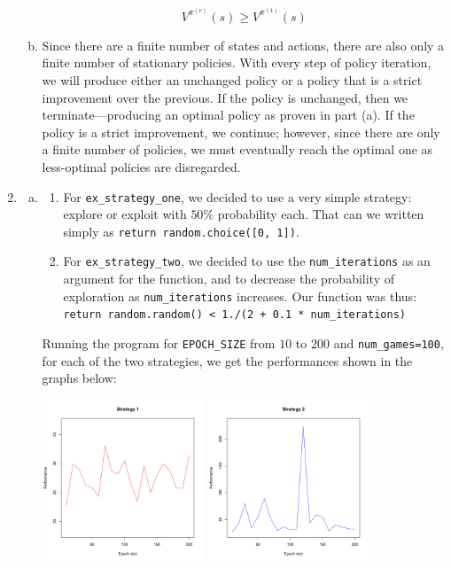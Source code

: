 \documentclass{article}
\begin{document}
\begin{enumerate}
\begin{enumerate}[(a)]
 $$V^{\pi^{(e)}}(s) \geq V^{\pi^{(1)}}(s)$$  
                \item Since there are a finite number of states and actions, there are also only a finite number of stationary policies. With every step of policy iteration, we will produce either an unchanged policy or a policy that is a strict improvement over the previous. If the policy is unchanged, then we terminate---producing an optimal policy as proven in part (a). If the policy is a strict improvement, we continue; however, since there are only a finite number of policies, we must eventually reach the optimal one as less-optimal policies are disregarded.
            \end{enumerate}        
        \item
            \begin{enumerate}[(a)]
                \item 
                \begin{enumerate}[1.]
                	\item
			 For \texttt{ex\_strategy\_one}, we decided to use a very simple strategy: explore or exploit with $50\%$ probability each. That can we written simply as \texttt{return random.choice([0, 1])}. 
		\item
			 For \texttt{ex\_strategy\_two}, we decided to use the \texttt{num\_iterations} as an argument for the function, and to decrease the probability of exploration as \texttt{num\_iterations} increases. Our function was thus: \texttt{return random.random() < 1./(2 + 0.1 * num\_iterations)}\\
		  \end{enumerate}	 
			 Running the program for \texttt{EPOCH\_SIZE} from $10$ to $200$ and \texttt{num\_games=100}, for each of the two strategies, we get the performances shown in the graphs below:
			 \begin{center}
			 	\includegraphics[width=0.4\textwidth]{graph1} \includegraphics[width=0.4\textwidth]{graph2}
			 \end{center}
			 

\end{enumerate}
\end{enumerate}
\end{document}
